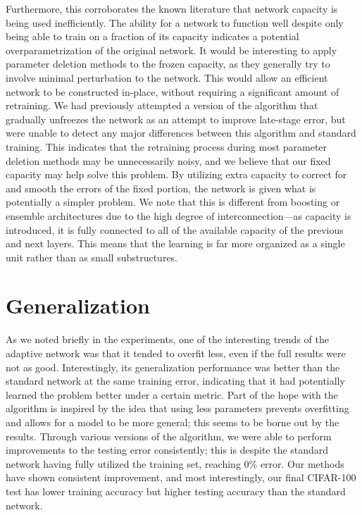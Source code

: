 Furthermore, this corroborates the known literature that network capacity is being used inefficiently.
The ability for a network to function well despite only being able to train on a fraction of its capacity indicates a potential overparametrization of the original network.
It would be interesting to apply parameter deletion methods to the frozen capacity, as they generally try to involve minimal perturbation to the network.
This would allow an efficient network to be constructed in-place, without requiring a significant amount of retraining.
We had previously attempted a version of the algorithm that gradually unfreezes the network as an attempt to improve late-stage error, but were unable to detect any major differences between this algorithm and standard training.
This indicates that the retraining process during most parameter deletion methods may be unnecessarily noisy, and we believe that our fixed capacity may help solve this problem.
By utilizing extra capacity to correct for and smooth the errors of the fixed portion, the network is given what is potentially a simpler problem.
We note that this is different from boosting or ensemble architectures due to the high degree of interconnection---as capacity is introduced, it is fully connected to all of the available capacity of the previous and next layers.
This means that the learning is far more organized as a single unit rather than as small substructures.

\section{Generalization}
As we noted briefly in the experiments, one of the interesting trends of the adaptive network was that it tended to overfit less, even if the full results were not as good.
Interestingly, its generalization performance was better than the standard network at the same training error, indicating that it had potentially learned the problem better under a certain metric.
Part of the hope with the algorithm is inspired by the idea that using less parameters prevents overfitting and allows for a model to be more general; this seems to be borne out by the results.
Through various versions of the algorithm, we were able to perform improvements to the testing error consistently; this is despite the standard network having fully utilized the training set, reaching 0\% error.
Our methods have shown consistent improvement, and most interestingly, our final CIFAR-100 test has lower training accuracy but higher testing accuracy than the standard network.


